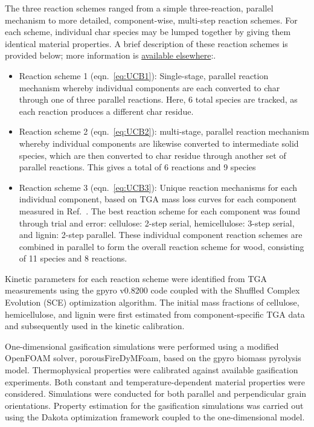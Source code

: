 \documentclass{article}
\begin{document}
The three reaction schemes ranged from a simple three-reaction, parallel mechanism to more detailed, component-wise, multi-step reaction schemes. For each scheme, individual char species may be lumped together by giving them identical material properties. A brief description of these reaction schemes is provided below; more information is \href{https://github.com/MaCFP/matl-db/tree/master/Wood/Calibration_Results/UCB#readme}{available elsewhere}:.
\begin{itemize}
	\item Reaction scheme 1 (eqn.~\ref{eq:UCB1}): Single-stage, parallel reaction mechanism whereby individual components are each converted to char through one of three parallel reactions. Here, 6 total species are tracked, as each reaction produces a different char residue. 
	\item Reaction scheme 2 (eqn.~\ref{eq:UCB2}): multi-stage, parallel reaction mechanism whereby individual components are likewise converted to intermediate solid species, which are then converted to char residue through another set of parallel reactions. This gives a total of 6 reactions and 9 species
	\item Reaction scheme 3 (eqn.~\ref{eq:UCB3}): Unique reaction mechanisms for each individual component, based on TGA mass loss curves for each component measured in Ref.~\cite{hasburgh2020chemical}. The best reaction scheme for each component was found through trial and error: cellulose: 2-step serial, hemicellulose: 3-step serial, and lignin: 2-step parallel. These individual component reaction schemes are combined in parallel to form the overall reaction scheme for wood, consisting of 11 species and 8 reactions. 
\end{itemize}
 Kinetic parameters for each reaction scheme were identified from TGA measurements using the gpyro v0.8200 code coupled with the Shuffled Complex Evolution (SCE) optimization algorithm. The initial mass fractions of cellulose, hemicellulose, and lignin were first estimated from component-specific TGA data and subsequently used in the kinetic calibration. 

One-dimensional gasification simulations were performed using a modified OpenFOAM solver, porousFireDyMFoam, based on the gpyro biomass pyrolysis model. Thermophysical properties were calibrated against available gasification experiments. Both constant and temperature-dependent material properties were considered. Simulations were conducted for both parallel and perpendicular grain orientations. Property estimation for the gasification simulations was carried out using the Dakota optimization framework coupled to the one-dimensional model.
\end{document}
